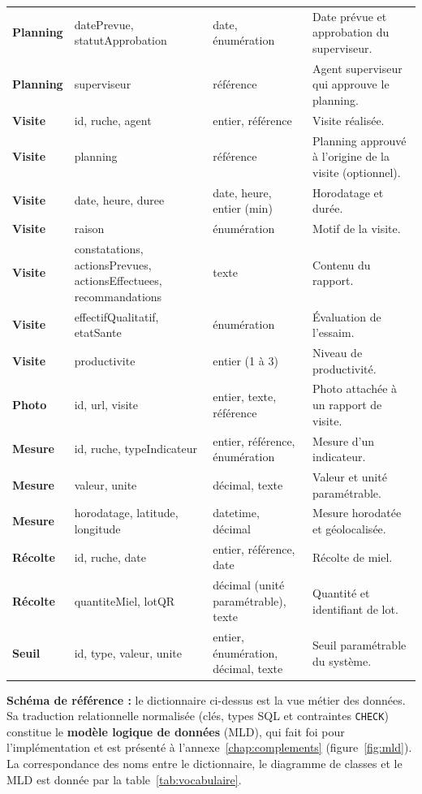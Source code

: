 \begin{xltabular}{\textwidth}{>{\bfseries}p{2.6cm} p{3.4cm} p{2.4cm} X}
Planning & datePrevue, statutApprobation & date, énumération & Date prévue et approbation du superviseur. \\
Planning & superviseur & référence & Agent superviseur qui approuve le planning. \\
Visite & id, ruche, agent & entier, référence & Visite réalisée. \\
Visite & planning & référence & Planning approuvé à l'origine de la visite (optionnel). \\
Visite & date, heure, duree & date, heure, entier (min) & Horodatage et durée. \\
Visite & raison & énumération & Motif de la visite. \\
Visite & constatations, actionsPrevues, actionsEffectuees, recommandations & texte & Contenu du rapport. \\
Visite & effectifQualitatif, etatSante & énumération & Évaluation de l'essaim. \\
Visite & productivite & entier (1 à 3) & Niveau de productivité. \\
Photo & id, url, visite & entier, texte, référence & Photo attachée à un rapport de visite. \\
Mesure & id, ruche, typeIndicateur & entier, référence, énumération & Mesure d'un indicateur. \\
Mesure & valeur, unite & décimal, texte & Valeur et unité paramétrable. \\
Mesure & horodatage, latitude, longitude & datetime, décimal & Mesure horodatée et géolocalisée. \\
Récolte & id, ruche, date & entier, référence, date & Récolte de miel. \\
Récolte & quantiteMiel, lotQR & décimal (unité paramétrable), texte & Quantité et identifiant de lot. \\
Seuil & id, type, valeur, unite & entier, énumération, décimal, texte & Seuil paramétrable du système. \\
\bottomrule
\end{xltabular}

\begin{encadre}
\textbf{Schéma de référence :} le dictionnaire ci-dessus est la vue métier des
données. Sa traduction relationnelle normalisée (clés, types SQL et contraintes
\texttt{CHECK}) constitue le \textbf{modèle logique de données} (MLD), qui fait
foi pour l'implémentation et est présenté à l'annexe~\ref{chap:complements}
(figure~\ref{fig:mld}). La correspondance des noms entre le dictionnaire, le
diagramme de classes et le MLD est donnée par la table~\ref{tab:vocabulaire}.
\end{encadre}

